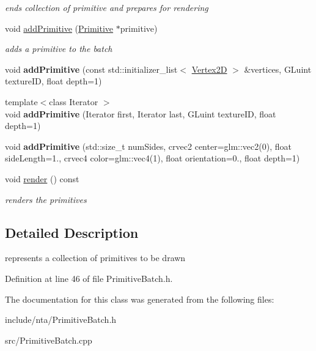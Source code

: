 \begin{DoxyCompactItemize}
\begin{DoxyCompactList}\small\item\em ends collection of primitive and prepares for rendering \end{DoxyCompactList}\item 
\mbox{\label{classnta_1_1PrimitiveBatch_a61a1fd06003233eac050ea7317fafc43}} 
void \hyperlink{classnta_1_1PrimitiveBatch_a61a1fd06003233eac050ea7317fafc43}{add\+Primitive} (\hyperlink{structnta_1_1Primitive}{Primitive} $\ast$primitive)
\begin{DoxyCompactList}\small\item\em adds a primitive to the batch \end{DoxyCompactList}\item 
\mbox{\label{classnta_1_1PrimitiveBatch_abedaa386e7b5cf893cdb8cc27c0abd1b}} 
void {\bfseries add\+Primitive} (const std\+::initializer\+\_\+list$<$ \hyperlink{structnta_1_1Vertex2D}{Vertex2D} $>$ \&vertices, G\+Luint texture\+ID, float depth=1)
\item 
\mbox{\label{classnta_1_1PrimitiveBatch_add8cd5b6fb3b34c68c1672b4ff7a3a69}} 
{\footnotesize template$<$class Iterator $>$ }\\void {\bfseries add\+Primitive} (Iterator first, Iterator last, G\+Luint texture\+ID, float depth=1)
\item 
\mbox{\label{classnta_1_1PrimitiveBatch_a8113bdc865528bd2983bebb4fd6d5660}} 
void {\bfseries add\+Primitive} (std\+::size\+\_\+t num\+Sides, crvec2 center=glm\+::vec2(0), float side\+Length=1., crvec4 color=glm\+::vec4(1), float orientation=0., float depth=1)
\item 
\mbox{\label{classnta_1_1PrimitiveBatch_a899411db2d7abc313d8bef4a19fd097e}} 
void \hyperlink{classnta_1_1PrimitiveBatch_a899411db2d7abc313d8bef4a19fd097e}{render} () const
\begin{DoxyCompactList}\small\item\em renders the primitives \end{DoxyCompactList}\end{DoxyCompactItemize}


\subsection{Detailed Description}
represents a collection of primitives to be drawn 

Definition at line 46 of file Primitive\+Batch.\+h.



The documentation for this class was generated from the following files\+:\begin{DoxyCompactItemize}
\item 
include/nta/Primitive\+Batch.\+h\item 
src/Primitive\+Batch.\+cpp\end{DoxyCompactItemize}
